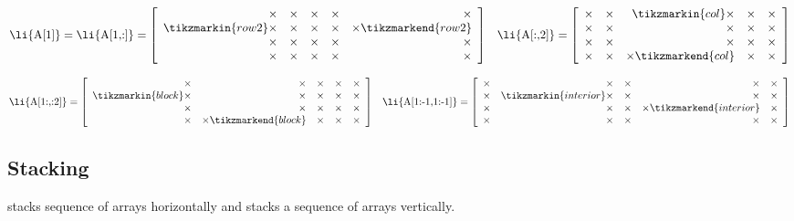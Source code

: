\begin{align*}
\text{\li{A[1]}} = \text{\li{A[1,:]}} = \left[\begin{array}{rrrrr}
\times & \times & \times & \times & \times\\
\tikzmarkin{row2}\times & \times & \times & \times & \times\tikzmarkend{row2}\\
\times & \times & \times & \times & \times\\
\times & \times & \times & \times & \times\\
\end{array}\right]
&&
\text{\li{A[:,2]}} = \left[\begin{array}{rrrrr}
\times & \times & \tikzmarkin{col}\times & \times & \times\\
\times & \times & \times & \times & \times\\
\times & \times & \times & \times & \times\\
\times & \times & \times\tikzmarkend{col} & \times & \times
\end{array}\right]
\end{align*}

\begin{align*}
\text{\li{A[1:,:2]}} = \left[\begin{array}{rrrrr}
\times & \times & \times & \times & \times\\
\tikzmarkin{block}\times & \times & \times & \times & \times\\
\times & \times & \times & \times & \times\\
\times & \times\tikzmarkend{block} & \times & \times & \times
\end{array}\right]
&&
\text{\li{A[1:-1,1:-1]}} = \left[\begin{array}{rrrrr}
\times & \times & \times & \times & \times\\
\times & \tikzmarkin{interior} \times & \times & \times & \times\\
\times & \times & \times & \times \tikzmarkend{interior} & \times\\
\times & \times & \times & \times & \times\end{array}\right]
\end{align*}

\subsection*{Stacking} %

 stacks sequence of arrays horizontally and  stacks a sequence of arrays vertically.

